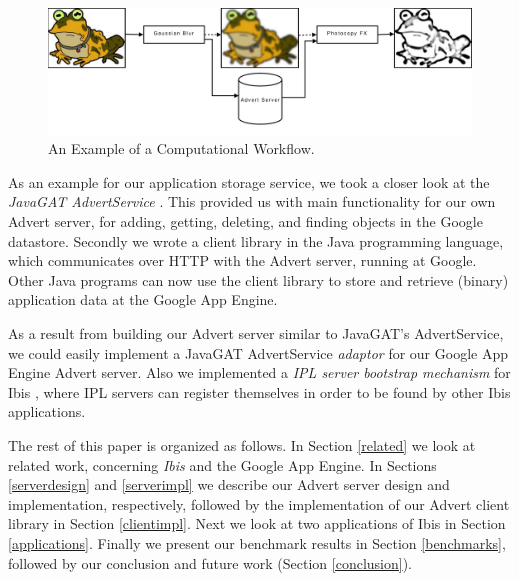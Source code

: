 \begin{figure}[ht] %
\begin{center}
\includegraphics[width=14cm]{./figures/image_workflow.pdf} 
\caption{An Example of a Computational Workflow.\label{img-workflow}}
\end{center}
\end{figure}

As an example for our application storage service, we took a closer look at
the \emph{JavaGAT AdvertService} \cite{javagat-www}. This provided us with main
functionality for our own Advert server, for adding, getting, deleting, and
finding objects in the Google datastore. Secondly we wrote a client library in
the Java programming language, which communicates over HTTP with the Advert
server, running at Google. Other Java programs can now use the client library
to store and retrieve (binary) application data at the Google App Engine.

As a result from building our Advert server similar to JavaGAT's AdvertService,
we could easily implement a JavaGAT AdvertService \emph{adaptor} for our
Google App Engine Advert server. Also we implemented a \emph{IPL server
bootstrap mechanism} for Ibis \cite{ipl-www}, where IPL servers can register
themselves in order to be found by other Ibis applications.

The rest of this paper is organized as follows. In Section \ref{related}
we look at related work, concerning \emph{Ibis} and the Google App Engine. In
Sections \ref{serverdesign} and \ref{serverimpl} we describe our Advert server
design and implementation, respectively, followed by the implementation of our
Advert client library in Section \ref{clientimpl}. Next we look at two
applications of Ibis in Section \ref{applications}. Finally we
present our benchmark results in Section \ref{benchmarks}, followed by our
conclusion and future work (Section \ref{conclusion}).
